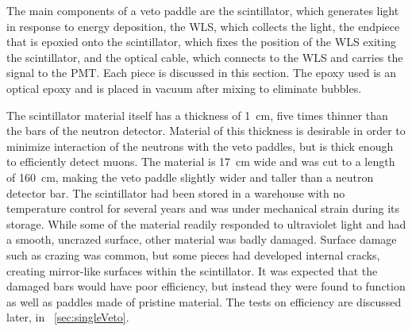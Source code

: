 The main components of a veto paddle are the scintillator, which generates light in response to energy deposition, the WLS, which collects the light, the endpiece that is epoxied onto the scintillator, which fixes the position of the WLS exiting the scintillator, and the optical cable, which connects to the WLS and carries the signal to the PMT.  Each piece is discussed in this section.  The epoxy used is an optical epoxy and is placed in vacuum after mixing to eliminate bubbles.

The scintillator material itself has a thickness of 1~cm, five times thinner than the bars of the neutron detector.  Material of this thickness is desirable in order to minimize interaction of the neutrons with the veto paddles, but is thick enough to efficiently detect muons.  The material is 17~cm wide and was cut to a length of 160~cm, making the veto paddle slightly wider and taller than a neutron detector bar.  The scintillator had been stored in a warehouse with no temperature control for several years and was under mechanical strain during its storage.  While some of the material readily responded to ultraviolet light and had a smooth, uncrazed surface, other material was badly damaged.  Surface damage such as crazing was common, but some pieces had developed internal cracks, creating mirror-like surfaces within the scintillator.  It was expected that the damaged bars would have poor efficiency, but instead they were found to function as well as paddles made of pristine material.  The tests on efficiency are discussed later, in {\sect}~\ref{sec:singleVeto}.

